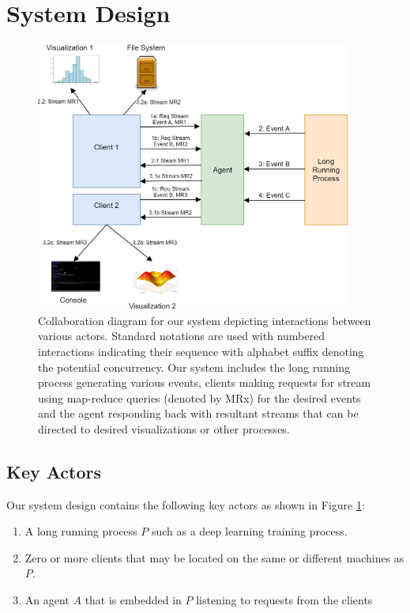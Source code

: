 \documentclass[sigchi]{acmart} %
\begin{document}
\section{System Design}

\begin{figure}[ht]
  \centering
  \includegraphics[height=3.5in]{TensorWatch_Collaboration}
  \caption{Collaboration diagram for our system depicting interactions between various actors. Standard notations are used with numbered interactions indicating their sequence with alphabet suffix denoting the potential concurrency. Our system includes the long running process generating various events, clients making requests for stream using map-reduce queries (denoted by MRx) for the desired events and the agent responding back with resultant streams that can be directed to desired visualizations or other processes.}
  \label{fig:TensorWatch_Collaboration}
\end{figure}

\subsection{Key Actors}
Our system design contains the following key actors as shown in Figure \ref{fig:TensorWatch_Collaboration}:
\begin{enumerate}
  \item A long running process $P$ such as a deep learning training process.
  \item Zero or more clients that may be located on the  same or different machines as $P$.
  \item An agent $A$ that is embedded in $P$ listening to requests from the clients
\end{enumerate}
\end{document}
